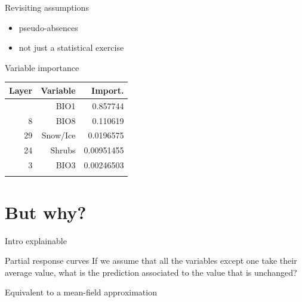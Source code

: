 \documentclass[12pt, smalloffset, compress, aspectratio=1610]{beamer}
\providecommand{\tightlist}{%
  \setlength{\itemsep}{0pt}\setlength{\parskip}{0pt}}
\begin{document}
\begin{frame}{Revisiting assumptions}
\label{revisiting-assumptions}
\begin{itemize}
\tightlist
\item
  pseudo-absences
\item
  not just a statistical exercise
\end{itemize}
\end{frame}

\begin{frame}{Variable importance}
\label{variable-importance}
\begin{longtable}[]{@{}rrr@{}}
\toprule\noalign{}
\textbf{Layer} & \textbf{Variable} & \textbf{Import.} \\
\midrule\noalign{}
\endhead
1 & BIO1 & 0.857744 \\
8 & BIO8 & 0.110619 \\
29 & Snow/Ice & 0.0196575 \\
24 & Shrubs & 0.00951455 \\
3 & BIO3 & 0.00246503 \\
\bottomrule\noalign{}
\end{longtable}
\end{frame}

\section{But why?}\label{but-why-1}

\begin{frame}{Intro explainable}
\label{intro-explainable}
\end{frame}

\begin{frame}{Partial response curves}
\label{partial-response-curves}
If we assume that all the variables except one take their average value,
what is the prediction associated to the value that is unchanged?

Equivalent to a mean-field approximation
\end{frame}
\end{document}
